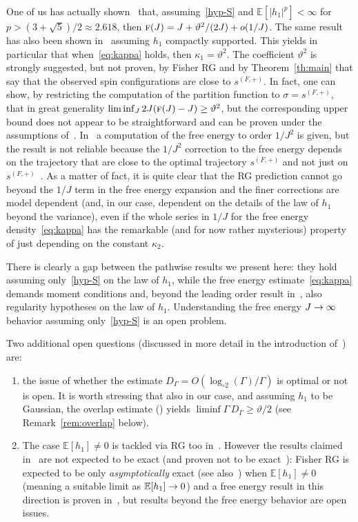 \documentclass[AHL,Unicode,longabstracts,published]{cedram}
\newcommand{\bbE}{\mathbb{E}}
\newcommand{\gG}{\Gamma}
\newcommand{\gs}{\sigma}
\newcommand{\tf}{\textsc{f}}
\newcommand{\loglog}{\log_{\circ 2}}
\renewcommand*{\to}{\mathchoice{\longrightarrow}{\rightarrow}{\rightarrow}{\rightarrow}}
\begin{document}
One of us has actually shown~\cite{cf:Orphee} that, assuming~\eqref{hyp-S} and $\bbE[| h_1|^p] <\infty$ for $p>(3 + \sqrt{5})/2\approx 2.618$, then $\tf (J) = J+{\vartheta^2}/{(2J) }+ o(1/J)$. The same result has also been shown in~\cite{cf:DMSDS-B} assuming $h_1$ compactly supported. This yields in particular that when~\eqref{eq:kappa} holds, then $\kappa_1=\vartheta^2$. The coefficient $\vartheta^2$ is strongly suggested, but not proven, by Fisher RG and by Theorem~\ref{th:main} that say that the observed spin configurations are close to $s^{(F, +)}$. In fact, one can show, by restricting the computation of the partition function to $\gs=s^{(F, +)}$, that in great generality $\liminf_{J} 2J (\tf (J)-J)\ge \vartheta^2$, but the corresponding upper bound does not appear to be straightforward and can be proven under the assumptions of~\cite{cf:Orphee}. In~\cite{cf:FLDM01} a computation of the free energy to order $1/J^2$ is given, but the result is not reliable because the $1/J^2$ correction to the free energy depends on the trajectory that are close to the optimal trajectory $s^{(F, +)}$ and not just on $s^{(F, +)}$~\cite{cf:GG22}. As a matter of fact, it is quite clear that the RG prediction cannot go beyond the $1/J$ term in the free energy expansion and the finer corrections are model dependent (and, in our case, dependent on the details of the law of $h_1$ beyond the variance), even if the whole series in $1/J$ for the free energy density~\eqref{eq:kappa} has the remarkable (and for now rather mysterious) property of just depending on the constant $\kappa_2$.


There is clearly a gap between the pathwise results we present here: they hold assuming only~\eqref{hyp-S} on the law of $h_1$, while the free energy estimate~\eqref{eq:kappa} demands moment conditions and, beyond the leading order result in~\cite{cf:Orphee}, also regularity hypotheses on the law of $h_1$. Understanding the free energy $J \to \infty$ behavior assuming only~\eqref{hyp-S} is an open problem.

\pagebreak
Two additional open questions (discussed in more detail in the introduction of~\cite{cf:CGH1}) are:
\begin{enumerate}
\item the issue of whether the estimate $D_\gG=O(\loglog (\gG) / \gG)$ is optimal or not is open. It is worth stressing that also in our case, and assuming $h_1$ to be Gaussian, the overlap estimate (\cite[Remark~2.7]{cf:CGH1}) yields $\liminf \gG \, {D_\gG\ge \vartheta/2}$ (see Remark~\ref{rem:overlap} below).

\item The case $\bbE[h_1]\neq 0$ is tackled via RG too in~\cite{cf:FLDM01}. However the results claimed in~\cite{cf:FLDM01} are not expected to be exact (and proven not to be exact~\cite{cf:GGG17,cf:DH83}): Fisher RG is expected to be only \emph{asymptotically} exact (see also~\cite{cf:IM,cf:Vojta}) when $\bbE[h_1]\neq 0$ (meaning a suitable limit as $\bbE[h_1]\to 0$) and a free energy result in this direction is proven in~\cite{cf:GGG17}, but results beyond the free energy behavior are open issues.
\end{enumerate}
\end{document}
